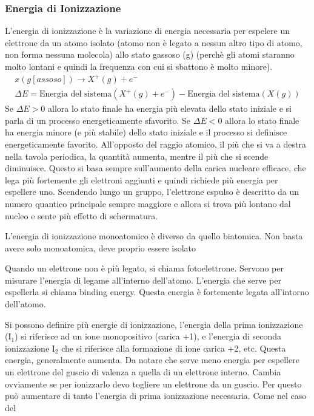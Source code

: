 \documentclass[a4paper]{article}
\begin{document}
\subsubsection{Energia di Ionizzazione}
L'energia di ionizzazione è la variazione di energia necessaria per espelere un elettrone da un atomo isolato (atomo non è legato a nessun altro tipo di atomo, non forma nessuna molecola) allo stato gassoso (g) (perchè gli atomi staranno molto lontani e quindi la frequenza con cui si sbattono è molto minore). 
\begin{gather*}
    x(g[assoso]) \rightarrow X^+(g)+e^-\\
    \Delta E = \text{Energia del sistema}(X^+(g)+e^-) - \text{Energia del sistema} (X(g))
\end{gather*}
Se $\Delta E > 0$ allora lo stato finale ha energia più elevata dello stato iniziale e si parla di un processo energeticamente sfavorito. Se $\Delta E<0$ allora lo stato finale ha energia minore (e più stabile) dello stato iniziale e il processo si definisce energeticamente favorito. All'opposto del raggio atomico, il più che si va a destra nella tavola periodica, la quantità aumenta, mentre il più che si scende diminuisce. Questo si basa sempre sull'aumento della carica nucleare efficace, che lega più fortemente gli elettroni aggiunti e quindi richiede più energia per espellere uno. Scendendo lungo un gruppo, l'elettrone espulso è descritto da un numero quantico principale sempre maggiore e allora si trova più lontano dal nucleo e sente più effetto di schermatura. 

L'energia di ionizzazione monoatomico è diverso da quello biatomica. Non basta avere solo monoatomica, deve proprio essere isolato

Quando un elettrone non è più legato, si chiama fotoelettrone. Servono per misurare l'energia di legame all'interno dell'atomo. L'energia che serve per espellerla si chiama binding energy. Questa energia è fortemente legata all'intorno dell'atomo. 

Si possono definire più energie di ionizzazione, l'energia della prima ionizzazione (I$_1$) si riferisce ad un ione monopositivo (carica +1), e l'energia di seconda ionizzazione I$_2$ che si riferisce alla formazione di ione carica +2, etc. Questa energia, generalmente aumenta. Da notare che serve meno energia per espellere un elettrone del guscio di valenza a quella di un elettrone interno. Cambia ovviamente se per ionizzarlo devo togliere un elettrone da un guscio. Per questo può aumentare di tanto l'energia di prima ionizzazione necessaria. Come nel caso del 
\end{document}
